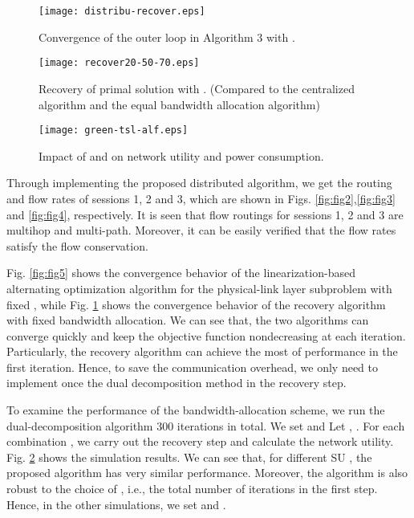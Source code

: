 \documentclass[12pt,onecolumn,tworows]{IEEEtran}
\begin{document}
\begin{figure}
\centering
\texttt{[image: distribu-recover.eps]}
\centering
\caption{Convergence of the outer loop in Algorithm 3 with .}
\centering
\label{fig:fig6}
\centering
\end{figure}

\begin{figure}
\centering
\texttt{[image: recover20-50-70.eps]}
\centering
\caption{Recovery of primal solution with . (Compared to the centralized algorithm and the equal bandwidth allocation algorithm)}
\centering
\label{fig:fig7}
\centering
\end{figure}

\begin{figure}
\centering
\texttt{[image: green-tsl-alf.eps]}
\centering
\caption{Impact of  and  on network utility and power consumption.}
\centering
\label{fig:fig8}
\centering
\end{figure}


Through implementing the proposed distributed algorithm, we get the routing and flow rates of sessions 1, 2 and 3, which are shown in Figs. \ref{fig:fig2},\ref{fig:fig3} and \ref{fig:fig4}, respectively. It is seen that flow routings for sessions 1, 2 and 3 are multihop and multi-path. Moreover, it can be easily verified that the flow rates satisfy the flow conservation.

Fig. \ref{fig:fig5} shows the convergence behavior of the linearization-based alternating optimization algorithm for the physical-link layer subproblem with fixed , while Fig. \ref{fig:fig6} shows the convergence behavior of the recovery algorithm with fixed bandwidth allocation. We can see that, the two algorithms can converge quickly and keep the objective function nondecreasing at each iteration. Particularly, the recovery algorithm can achieve the most of performance in the first iteration. Hence, to save the communication overhead, we only need to implement once the dual decomposition method in the recovery step.

To examine the performance of the bandwidth-allocation scheme, we run the dual-decomposition algorithm 300 iterations in total. We set  and Let , . For each combination , we carry out the recovery step and calculate the network utility. Fig. \ref{fig:fig7} shows the simulation results. We can see that, for different SU  , the proposed algorithm has very similar performance. Moreover, the algorithm is also robust to the choice of , i.e., the total number of iterations in the first step. Hence, in the other simulations, we set  and .
\end{document}
